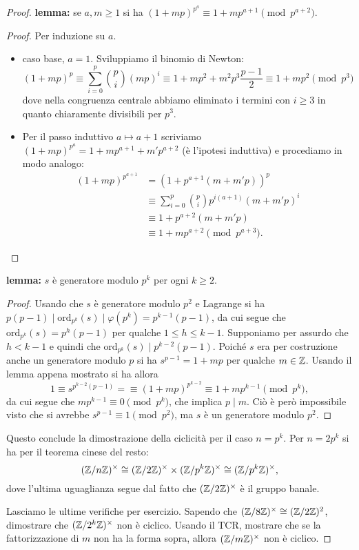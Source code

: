 \begin{proof}
    \textbf{lemma:} se $a,m \geq 1$ si ha $(1+mp)^{p^a} \equiv 1 + mp^{a+1} \pmod{p^{a+2}}$.
    \begin{proof}
        Per induzione su $a$. 
        \begin{itemize}
            \item caso base, $a=1$. Sviluppiamo il binomio di Newton:
                \[
                    (1+mp)^{p} \equiv \sum_{i=0}^{p} \binom{p}{i}(mp)^i \equiv 1 + mp^2 + m^2p^3 \frac{p-1}{2} \equiv 1 + mp^2 \pmod{p^3}
                \]
                dove nella congruenza centrale abbiamo eliminato i termini con $i \geq 3$ in quanto chiaramente divisibili per $p^3$.
            \item Per il passo induttivo $a \mapsto a+1$ scriviamo $(1+mp)^{p^a} = 1 + mp^{a+1} + m' p^{a+2}$ (è l'ipotesi induttiva) e procediamo in modo analogo:
            \begin{align*}
                (1+mp)^{p^{a+1}} &= (1 + p^{a+1}(m+m'p))^p \\
                &\equiv \sum_{i=0}^{p} \binom{p}{i} p^{i(a+1)}(m+m'p)^i \\
                &\equiv 1 + p^{a+2}(m+m'p) \\
                &\equiv 1 + mp^{a+2} \pmod{p^{a+3}}.
            \end{align*}
        \end{itemize}
    \end{proof}
    \textbf{lemma:} $s$ è generatore modulo $p^k$ per ogni $k \geq 2$.
    \begin{proof}
        Usando che $s$ è generatore modulo $p^2$ e Lagrange si ha $p(p-1)  \mid  \text{ord}_{p^k}(s)  \mid  \varphi(p^k) = p^{k-1}(p-1)$, da cui segue che $\text{ord}_{p^k}(s) = p^h(p-1)$ per qualche $1 \leq h \leq k-1$. Supponiamo per assurdo che $h < k-1$ e quindi che $\text{ord}_{p^k}(s)  \mid  p^{k-2}(p-1)$. Poiché $s$ era per costruzione anche un generatore modulo $p$ si ha $s^{p-1} = 1 + mp $ per qualche $m \in \mathbb{Z}$. Usando il lemma appena mostrato si ha allora \[ 1 \equiv s^{p^{k-2}(p-1)} =\equiv (1 + mp)^{p^{k-2}} \equiv 1 + mp^{k-1} \pmod{p^k}, \]
        da cui segue che $ mp^{k-1} \equiv 0\pmod{p^k}$, che implica $p  \mid  m$. Ciò è però impossibile visto che si avrebbe $s^{p-1} \equiv 1 \pmod{p^2}$, ma $s$ è un generatore modulo $p^2$. 
    \end{proof}
    Questo conclude la dimostrazione della ciclicità per il caso $n = p^k$. Per $n = 2p^k$ si ha per il teorema cinese del resto: \[(\mathbb{Z}/n\mathbb{Z})^\times \cong (\mathbb{Z}/2\mathbb{Z})^\times \times (\mathbb{Z}/p^k\mathbb{Z})^\times \cong (\mathbb{Z}/p^k\mathbb{Z})^\times,\]
    dove l'ultima uguaglianza segue dal fatto che $(\mathbb{Z}/2\mathbb{Z})^\times$ è il gruppo banale.

    Lasciamo le ultime verifiche per esercizio. Sapendo che $(\mathbb{Z}/8\mathbb{Z})^\times \cong (\mathbb{Z}/2\mathbb{Z})^2$, dimostrare che $(\mathbb{Z}/2^k\mathbb{Z})^\times$ non è ciclico. Usando il TCR, mostrare che se la fattorizzazione di $m$ non ha la forma sopra, allora $(\mathbb{Z}/m\mathbb{Z})^\times$ non è ciclico.
\end{proof}


